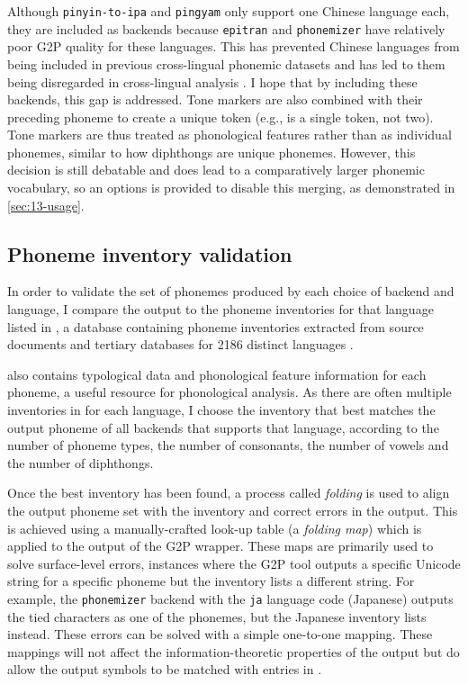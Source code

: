 Although \texttt{pinyin-to-ipa} and \texttt{pingyam} only support one Chinese language each, they are included as backends because \texttt{epitran} and \texttt{phonemizer} have relatively poor G2P quality for these languages. This has prevented Chinese languages from being included in previous cross-lingual phonemic datasets \citep{ahn-chodroff-2022-voxcommunis} and has led to them being disregarded in cross-lingual analysis \citep{pimentel2020phonotactic}. I hope that by including these backends, this gap is addressed. Tone markers are also combined with their preceding phoneme to create a unique token (e.g.,  is a single token, not two). Tone markers are thus treated as phonological features rather than as individual phonemes, similar to how diphthongs are unique phonemes. However, this decision is still debatable and does lead to a comparatively larger phonemic vocabulary, so an options is provided to disable this merging, as demonstrated in \cref{sec:13-usage}. 

\subsection{Phoneme inventory validation}\label{sec:13-folding}

In order to validate the set of phonemes produced by each choice of backend and language, I compare the output to the phoneme inventories for that language listed in \phoible, a database containing phoneme inventories extracted from source documents and tertiary databases for 2186 distinct languages \citep{phoible}.

\phoible also contains typological data and phonological feature information for each phoneme, a useful resource for phonological analysis. As there are often multiple inventories in \phoible for each language, I choose the inventory that best matches the output phoneme of all backends that supports that language, according to the number of phoneme types, the number of consonants, the number of vowels and the number of diphthongs.

Once the best inventory has been found, a process called \emph{folding} is used to align the output phoneme set with the inventory and correct errors in the output. This is achieved using a manually-crafted look-up table (a \emph{folding map}) which is applied to the output of the G2P wrapper. These maps are primarily used to solve surface-level errors, instances where the G2P tool outputs a specific Unicode string for a specific phoneme but the inventory lists a different string. For example, the \texttt{phonemizer} backend with the \texttt{ja} language code (Japanese) outputs the tied characters  as one of the phonemes, but the Japanese inventory lists  instead. These errors can be solved with a simple one-to-one mapping. These mappings will not affect the information-theoretic properties of the output but do allow the output symbols to be matched with entries in \phoible.

